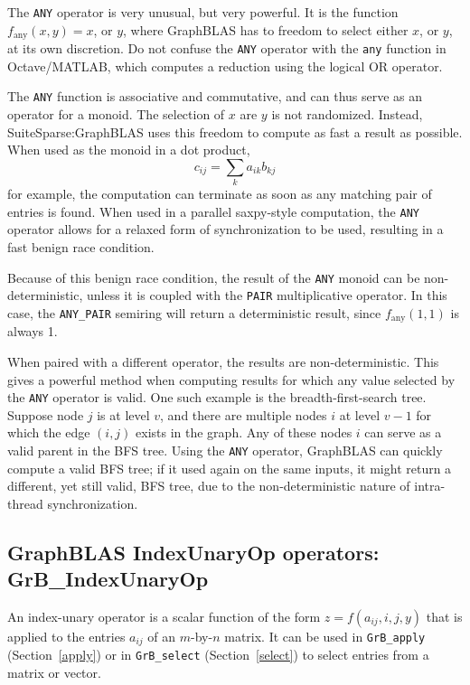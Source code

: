\documentclass[12pt]{article}
\begin{document}
{The \verb'ANY' operator is very unusual, but very powerful.  It is the function
$f_{\mbox{any}}(x,y)=x$, or $y$, where GraphBLAS has to freedom to select
either $x$, or $y$, at its own discretion.  Do not confuse the \verb'ANY'
operator with the \verb'any' function in Octave/MATLAB, which computes a reduction
using the logical OR operator.

The \verb'ANY' function is associative and commutative, and can thus serve as
an operator for a monoid.  The selection of $x$ are $y$ is not randomized.
Instead, SuiteSparse:GraphBLAS uses this freedom to compute as fast a result as
possible.  When used as the monoid in a dot product, \[ c_{ij} = \sum_k a_{ik}
b_{kj} \] for example, the computation can terminate as soon as any matching
pair of entries is found.  When used in a parallel saxpy-style computation, the
\verb'ANY' operator allows for a relaxed form of synchronization to be used,
resulting in a fast benign race condition.

Because of this benign race condition, the result of the \verb'ANY' monoid can
be non-deterministic, unless it is coupled with the \verb'PAIR' multiplicative
operator.  In this case, the \verb'ANY_PAIR' semiring will return a
deterministic result, since $f_{\mbox{any}}(1,1)$ is always 1.

When paired with a different operator, the results are non-deterministic.  This
gives a powerful method when computing results for which any value selected by
the \verb'ANY' operator is valid.  One such example is the breadth-first-search
tree.  Suppose node $j$ is at level $v$, and there are multiple nodes $i$ at
level $v-1$ for which the edge $(i,j)$ exists in the graph.  Any of these nodes
$i$ can serve as a valid parent in the BFS tree.  Using the \verb'ANY'
operator, GraphBLAS can quickly compute a valid BFS tree; if it used again on
the same inputs, it might return a different, yet still valid, BFS tree, due to
the non-deterministic nature of intra-thread synchronization.

\newpage
\subsection{GraphBLAS IndexUnaryOp operators: {\sf GrB\_IndexUnaryOp}} %
\label{idxunop}

An index-unary operator is a scalar function of the form
$z=f(a_{ij},i,j,y)$ that is applied to the entries $a_{ij}$ of an
$m$-by-$n$ matrix.  It can be used in \verb'GrB_apply' (Section~\ref{apply}) or
in \verb'GrB_select' (Section~\ref{select}) to select entries from a matrix or
vector.

}
\end{document}
